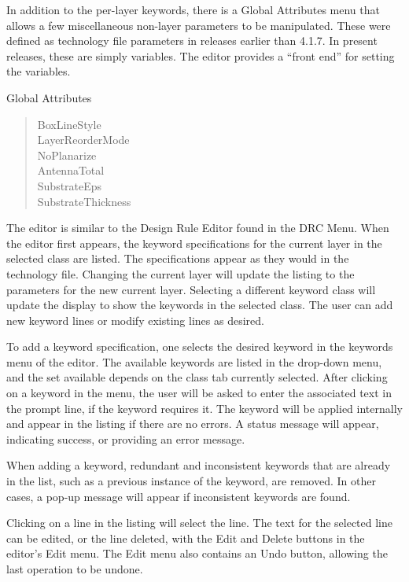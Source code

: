 In addition to the per-layer keywords, there is a {\cb Global
Attributes} menu that allows a few miscellaneous non-layer parameters
to be manipulated.  These were defined as technology file parameters
in {\Xic} releases earlier than 4.1.7.  In present releases, these are
simply variables.  The editor provides a ``front end'' for setting the
variables.

\begin{description}
\item{\cb Global Attributes}\\
\begin{quote} \vt
BoxLineStyle\\
LayerReorderMode\\
NoPlanarize\\
AntennaTotal\\
SubstrateEps\\
SubstrateThickness
\end{quote}
\end{description}

The editor is similar to the {\cb Design Rule Editor} found in the
{\cb DRC Menu}.  When the editor first appears, the keyword
specifications for the current layer in the selected class are listed. 
The specifications appear as they would in the technology file. 
Changing the current layer will update the listing to the parameters
for the new current layer.  Selecting a different keyword class will
update the display to show the keywords in the selected class.  The
user can add new keyword lines or modify existing lines as desired.

To add a keyword specification, one selects the desired keyword in the
keywords menu of the editor.  The available keywords are listed in the
drop-down menu, and the set available depends on the class tab
currently selected.  After clicking on a keyword in the menu, the user
will be asked to enter the associated text in the prompt line, if the
keyword requires it.  The keyword will be applied internally and
appear in the listing if there are no errors.  A status message will
appear, indicating success, or providing an error message.

When adding a keyword, redundant and inconsistent keywords that are
already in the list, such as a previous instance of the keyword, are
removed.  In other cases, a pop-up message will appear if inconsistent
keywords are found.

Clicking on a line in the listing will select the line.  The text for
the selected line can be edited, or the line deleted, with the {\cb
Edit} and {\cb Delete} buttons in the editor's {\cb Edit} menu.  The
{\cb Edit} menu also contains an {\cb Undo} button, allowing the last
operation to be undone.


